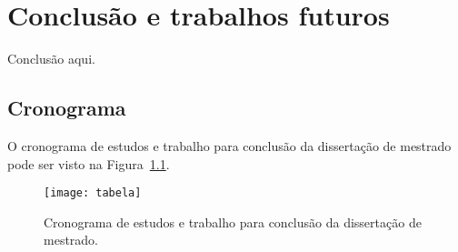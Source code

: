 \pagestyle{empty}
\cleardoublepage
\pagestyle{fancy}
\chapter{Conclusão e trabalhos futuros}\label{cap4}

Conclusão aqui.

\section{Cronograma}
O cronograma de estudos e trabalho para conclusão da dissertação de mestrado pode ser visto na Figura~\ref{fig:tabela}.

 \begin{figure}[htbp]
     \begin{center}
     \texttt{[image: tabela]}
     \caption{Cronograma de estudos e trabalho para conclusão da dissertação de mestrado.} 
     \label{fig:tabela}
     \end{center}
 \end{figure}